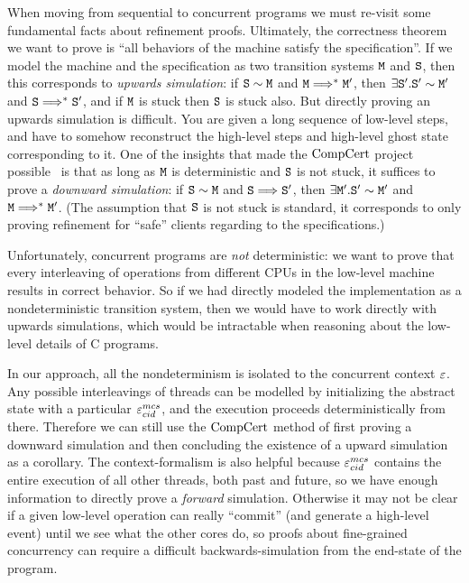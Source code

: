 When moving from sequential to concurrent programs we must
re-visit some fundamental facts about refinement proofs.  Ultimately,
the correctness theorem we want to prove is ``all behaviors of the
machine satisfy the specification''. If we model the machine and the
specification as two transition systems ${\mathrm{\texttt{M}}}$ and ${\mathrm{\texttt{S}}}$, then this
corresponds to \emph{upwards simulation}: if ${\mathrm{\texttt{S}}} \sim {\mathrm{\texttt{M}}}$ and 
${\mathrm{\texttt{M}}} \Longrightarrow^* {\mathrm{\texttt{M}}}'$, then $\exists {\mathrm{\texttt{S}}}'. {\mathrm{\texttt{S}}}' \sim {\mathrm{\texttt{M}}}'$ and
 ${\mathrm{\texttt{S}}} \Longrightarrow^* {\mathrm{\texttt{S}}}'$, and if ${\mathrm{\texttt{M}}}$ is stuck then ${\mathrm{\texttt{S}}}$ is stuck also.
But directly proving an upwards simulation is difficult. You are given
a long sequence of low-level steps, and have to somehow reconstruct
the high-level steps and high-level ghost state corresponding to
it. One of the insights that made the $\mathrm{CompCert}$ project
possible~\cite{Leroy-backend} is that as long as ${\mathrm{\texttt{M}}}$ is deterministic
and ${\mathrm{\texttt{S}}}$ is not stuck, it suffices to prove a \emph{downward
  simulation}: if ${\mathrm{\texttt{S}}} \sim {\mathrm{\texttt{M}}}$ and ${\mathrm{\texttt{S}}} \Longrightarrow {\mathrm{\texttt{S}}}'$, then $\exists
{\mathrm{\texttt{M}}}'. {\mathrm{\texttt{S}}}' \sim {\mathrm{\texttt{M}}}'$ and ${\mathrm{\texttt{M}}} \Longrightarrow^* {\mathrm{\texttt{M}}}'$. (The assumption that ${\mathrm{\texttt{S}}}$
is not stuck is standard, it corresponds to only proving refinement
for ``safe'' clients regarding to the specifications.)

Unfortunately, concurrent programs are \emph{not} deterministic: we
want to prove that every interleaving of operations from
different CPUs in the low-level machine results in correct
behavior. So if we had directly modeled the implementation as a
nondeterministic transition system, then we would have to work
directly with upwards simulations, which would be intractable when
reasoning about the low-level details of C programs.

In our approach, all the nondeterminism is isolated to the concurrent
context ${\varepsilon}$. Any possible interleavings of  threads can be
modelled by initializing the abstract state with a particular
${\varepsilon}^{mcs}_{cid}$, and the execution proceeds deterministically from
there. Therefore we can still use the $\mathrm{CompCert}$ method of first
proving a downward simulation and then concluding the existence of a
upward simulation as a corollary.
The context-formalism is also helpful because ${\varepsilon}^{mcs}_{cid}$ contains
the entire execution of all other threads, both past and future, so we
have enough information to directly prove a \emph{forward}
simulation. Otherwise it may not be clear if a given low-level
operation can really ``commit'' (and generate a high-level event)
until we see what the other cores do, so proofs about fine-grained
concurrency can require a difficult backwards-simulation
from the end-state of the program.~\cite{DGLMQueue}

